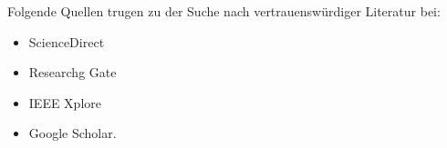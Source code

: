 Folgende Quellen trugen zu der Suche nach vertrauenswürdiger Literatur bei:

\begin{itemize}
    \item ScienceDirect
    \item Researchg Gate
    \item IEEE Xplore
    \item Google Scholar.
\end{itemize}

